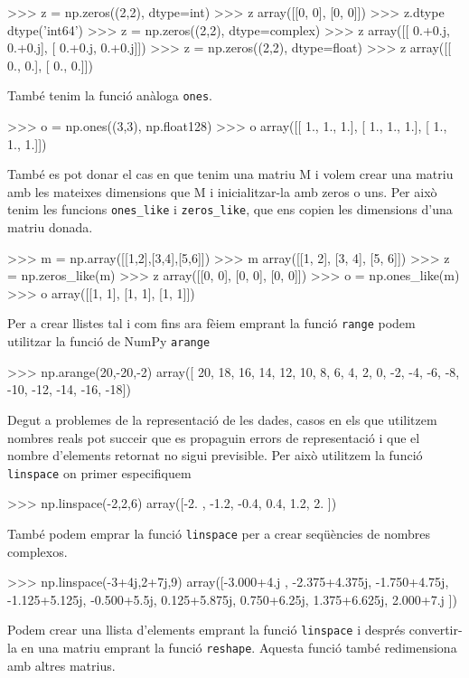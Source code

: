 \begin{tip}[caption=Inicialització amb funcio zeros()]
>>> z = np.zeros((2,2), dtype=int)
>>> z
array([[0, 0],
       [0, 0]])
>>> z.dtype
dtype('int64')
>>> z = np.zeros((2,2), dtype=complex)
>>> z
array([[ 0.+0.j,  0.+0.j],
       [ 0.+0.j,  0.+0.j]])
>>> z = np.zeros((2,2), dtype=float)
>>> z
array([[ 0.,  0.],
       [ 0.,  0.]])
\end{tip}


També tenim la funció anàloga {\tt ones}.

\begin{tip}[caption=Inicialització amb funcio ones()]
>>> o = np.ones((3,3), np.float128)
>>> o
array([[ 1.,  1.,  1.],
       [ 1.,  1.,  1.],
       [ 1.,  1.,  1.]])
\end{tip}


També es pot donar el cas en que tenim una matriu M i volem crear una matriu amb les mateixes dimensions que M i inicialitzar-la amb zeros o uns. Per això tenim les funcions {\tt ones\_like} i {\tt zeros\_like}, que ens copien les dimensions d'una matriu donada.


\begin{tip}[caption=Zeros like i ones like]
>>> m = np.array([[1,2],[3,4],[5,6]])
>>> m
array([[1, 2],
       [3, 4],
       [5, 6]])
>>> z = np.zeros_like(m)
>>> z
array([[0, 0],
       [0, 0],
       [0, 0]])
>>> o = np.ones_like(m)
>>> o
array([[1, 1],
       [1, 1],
       [1, 1]])
\end{tip}

Per a crear llistes tal i com fins ara fèiem emprant la funció {\tt range} podem utilitzar la funció  de NumPy {\tt arange}


\begin{blockcode}
>>> np.arange(20,-20,-2)
array([ 20,  18,  16,  14,  12,  10,   8,   6,   4,   2,   
0,  -2,  -4,  -6,  -8, -10, -12, -14, -16, -18])
\end{blockcode}
Degut a problemes de la representació de les dades, casos en els que utilitzem nombres reals pot succeir que es propaguin errors de representació i que el nombre d'elements retornat no sigui previsible. Per això utilitzem la funció {\tt linspace} on primer especifiquem
\begin{blockcode}
>>> np.linspace(-2,2,6)
array([-2. , -1.2, -0.4,  0.4,  1.2,  2. ])
\end{blockcode}
També podem emprar la funció {\tt linspace} per a crear seqüències de nombres complexos.
\begin{blockcode}
>>> np.linspace(-3+4j,2+7j,9)
array([-3.000+4.j , -2.375+4.375j, -1.750+4.75j, -1.125+5.125j,
       -0.500+5.5j,  0.125+5.875j,  0.750+6.25j,  1.375+6.625j,
        2.000+7.j   ])
\end{blockcode}
Podem crear una llista d'elements emprant la funció {\tt linspace} i després convertir-la en una matriu emprant la funció {\tt reshape}. Aquesta funció també redimensiona amb altres matrius.

